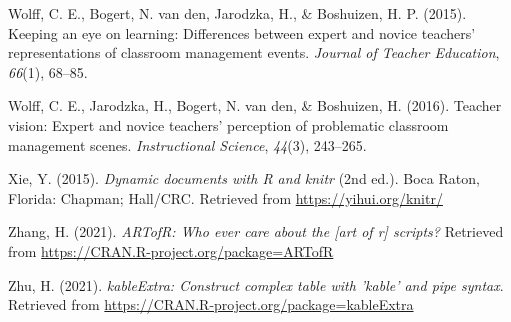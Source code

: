 \documentclass[
  man]{apa6}
\newlength{\cslhangindent}
\newenvironment{CSLReferences}[2] %
 {\begin{list}{}{%
  \setlength{\itemindent}{0pt}
  \setlength{\leftmargin}{0pt}
  \setlength{\parsep}{0pt}
  \ifodd #1
   \setlength{\leftmargin}{\cslhangindent}
   \setlength{\itemindent}{-1\cslhangindent}
  \fi
  \setlength{\itemsep}{#2\baselineskip}}}
 {\end{list}}
\begin{document}
\begin{CSLReferences}{1}{0}
Wolff, C. E., Bogert, N. van den, Jarodzka, H., \& Boshuizen, H. P. (2015). Keeping an eye on learning: Differences between expert and novice teachers' representations of classroom management events. \emph{Journal of Teacher Education}, \emph{66}(1), 68--85.

Wolff, C. E., Jarodzka, H., Bogert, N. van den, \& Boshuizen, H. (2016). Teacher vision: Expert and novice teachers' perception of problematic classroom management scenes. \emph{Instructional Science}, \emph{44}(3), 243--265.

Xie, Y. (2015). \emph{Dynamic documents with {R} and knitr} (2nd ed.). Boca Raton, Florida: Chapman; Hall/CRC. Retrieved from \url{https://yihui.org/knitr/}

Zhang, H. (2021). \emph{ARTofR: Who ever care about the {[}art of r{]} scripts?} Retrieved from \url{https://CRAN.R-project.org/package=ARTofR}

Zhu, H. (2021). \emph{kableExtra: Construct complex table with 'kable' and pipe syntax}. Retrieved from \url{https://CRAN.R-project.org/package=kableExtra}

\end{CSLReferences}

\endgroup


\clearpage
\renewcommand{\listtablename}{Table captions}
\end{document}

